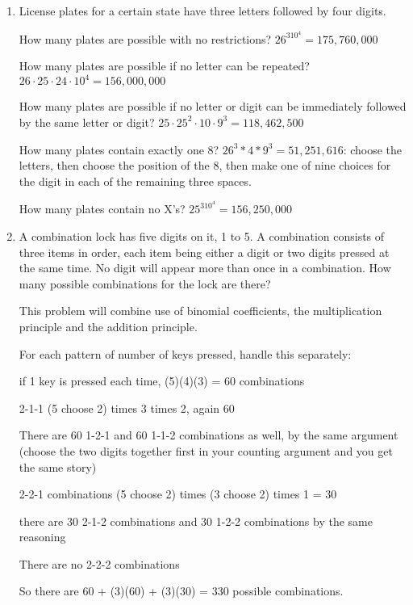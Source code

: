 \documentclass[12pt]{article}
\begin{document}
\begin{enumerate}
(15 choose 5) times (10 choose 5) times (5 choose 5) = 756,756

In how many ways can a group of 15 children divide themselves into three teams of five?  This is not the same question.

With any division of the children into three teams of five, there are six different ways to assign the three names to the teams.
So there are $\frac {756756}6$ ways to divide them into three teams, since there are six times as many ways to divide them into named teams:  the numerical answer is 126,126.

\newpage

\item  License plates for a certain state have three letters followed by four digits.

How many plates are possible with no restrictions?  $26^310^4=175,760,000$

How many plates are possible if no letter can be repeated?  $26\cdot25\cdot24\cdot 10^4 = 156,000,000$

How many plates are possible if no letter or digit can be immediately followed by the same letter or digit?
$25\cdot25^2\cdot 10 \cdot 9^3=118,462,500$

How many plates contain exactly one 8?  $26^3*4*9^3=51,251,616$:  choose the letters, then choose the position of the 8, then make one of nine choices for the digit in each of the remaining three spaces.

How many plates contain no X's?  $25^310^4 = 156,250,000$

\newpage

\item  A combination lock has five digits on it, 1 to 5.  A combination consists of three items in order, each item being either a digit
or two digits pressed at the same time.  No digit will appear more than once in a combination.  How many possible combinations for the lock are there?

This problem will combine use of binomial coefficients, the multiplication principle and the addition principle.

For each pattern of number of keys pressed, handle this separately:

if 1 key is pressed each time, (5)(4)(3) = 60 combinations

2-1-1  (5 choose 2) times 3 times 2, again 60

There are 60 1-2-1 and 60 1-1-2 combinations as well, by the same argument (choose the two digits together
first in your counting argument and you get the same story)

2-2-1 combinations (5 choose 2) times (3 choose 2) times 1 = 30

there are 30 2-1-2 combinations and 30 1-2-2 combinations by the same reasoning

There are no 2-2-2 combinations

So there are 60 + (3)(60) + (3)(30) = 330 possible combinations.

\end{enumerate}
\end{document}
